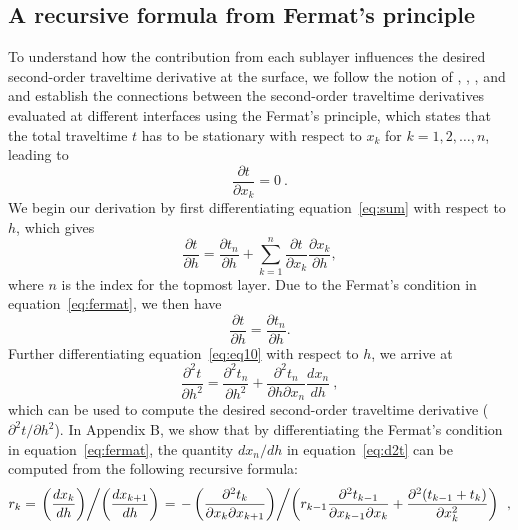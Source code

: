\subsection{A recursive formula from Fermat's principle}

To understand how the contribution from each sublayer influences the desired second-order traveltime derivative at the surface, we follow the notion of \cite{blias1981}, \cite{bliasgrit1984}, \cite{gritsenko}, and \cite{goldin} and establish the connections between the second-order traveltime derivatives evaluated at different interfaces using the Fermat's principle, which states that the total traveltime $t$ has to be stationary with respect to $x_k$ for $k=1,2,\ldots,n$, leading to
\begin{equation}
\label{eq:fermat}
\frac{\partial t}{\partial x_k}=0~.
\end{equation}
We begin our derivation by first differentiating equation~\ref{eq:sum} with respect to $h$, which gives
\begin{equation}
\label{eq:eq9}
\frac{\partial t}{\partial h}=\frac{\partial t_n}{\partial h}+\sum_{k=1}^n \frac{\partial t}{\partial x_k} \frac{\partial x_k}{\partial h},
\end{equation}
where $n$ is the index for the topmost layer. Due to the Fermat’s condition in equation~\ref{eq:fermat}, we then have
\begin{equation}
\label{eq:eq10}
\frac{\partial t}{\partial h}=\frac{\partial t_n}{\partial h}.
\end{equation}
Further differentiating equation~\ref{eq:eq10} with respect to $h$, we arrive at
\begin{equation}
\label{eq:d2t}
\frac{\partial^2 t}{\partial h^2} = \frac{\partial^2 t_n}{\partial h^2} + \frac{\partial^2 t_n}{\partial h \partial x_n} \frac{d x_n}{dh}~,
\end{equation}
which can be used to compute the desired second-order traveltime derivative (${\partial^2 t}/{\partial h^2}$). In Appendix B, we show that by differentiating the Fermat’s condition in equation~\ref{eq:fermat}, the quantity $d x_n/dh$ in equation~\ref{eq:d2t} can be computed from the following recursive formula:
\begin{equation}
\label{eq:recursion}
 r_k = \left. \left( \frac{d x_k}{d h}\right) \middle/ \left( \frac{d x_{k+1}}{d h}\right)\right. = \left. -\left( \frac{\partial^2 t_k}{\partial x_k \partial x_{k+1}} \right) \middle/ \left(  r_{k-1} \frac{\partial^2 t_{k-1}}{\partial x_{k-1} \partial x_k}  + \frac{\partial^2 (t_{k-1} + t_k)}{\partial x_k^2} \right)\right. ~,
\end{equation}
